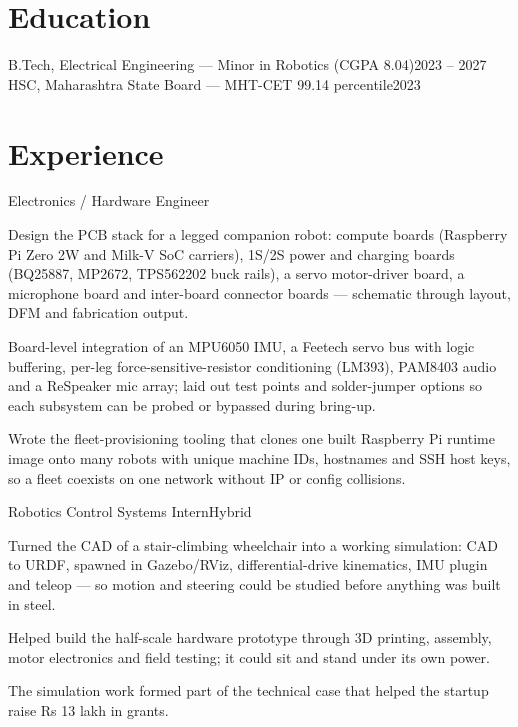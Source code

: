 \documentclass[a4paper,10pt]{article}
\begin{document}
\resumeheader

\section{Education}
      {B.Tech, Electrical Engineering --- Minor in Robotics (CGPA 8.04)}{2023 -- 2027}
\vspace{0.35em}
      {HSC, Maharashtra State Board --- MHT-CET 99.14 percentile}{2023}

\section{Experience}

      {Electronics / Hardware Engineer}{}
\begin{points}
  \item Design the PCB stack for a legged companion robot: compute boards (Raspberry Pi Zero 2W and Milk-V SoC carriers), 1S/2S power and charging boards (BQ25887, MP2672, TPS562202 buck rails), a servo motor-driver board, a microphone board and inter-board connector boards --- schematic through layout, DFM and fabrication output.
  \item Board-level integration of an MPU6050 IMU, a Feetech servo bus with logic buffering, per-leg force-sensitive-resistor conditioning (LM393), PAM8403 audio and a ReSpeaker mic array; laid out test points and solder-jumper options so each subsystem can be probed or bypassed during bring-up.
  \item Wrote the fleet-provisioning tooling that clones one built Raspberry Pi runtime image onto many robots with unique machine IDs, hostnames and SSH host keys, so a fleet coexists on one network without IP or config collisions.
\end{points}

      {Robotics Control Systems Intern}{Hybrid}
\begin{points}
  \item Turned the CAD of a stair-climbing wheelchair into a working simulation: CAD to URDF, spawned in Gazebo/RViz, differential-drive kinematics, IMU plugin and teleop --- so motion and steering could be studied before anything was built in steel.
  \item Helped build the half-scale hardware prototype through 3D printing, assembly, motor electronics and field testing; it could sit and stand under its own power.
  \item The simulation work formed part of the technical case that helped the startup raise Rs 13 lakh in grants.
\end{points}
\end{document}
